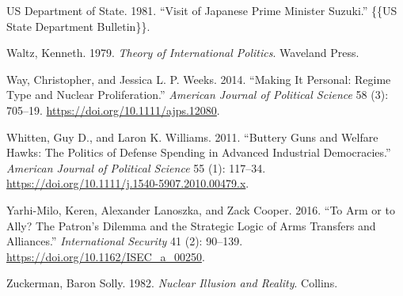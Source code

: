 \documentclass[
  12,
  letterpaper,
  DIV=11,
  numbers=noendperiod]{scrartcl}
\newlength{\cslhangindent}
\newlength{\cslentryspacingunit} %
\newenvironment{CSLReferences}[2] %
 {%
  \setlength{\parindent}{0pt}
  \ifodd #1
  \let\oldpar\par
  \def\par{\hangindent=\cslhangindent\oldpar}
  \fi
  \setlength{\parskip}{#2\cslentryspacingunit}
 }%
 {}
\begin{document}
\begin{CSLReferences}{1}{0}
\leavevmode{}%
US Department of State. 1981. {``Visit of {Japanese Prime Minister
Suzuki}.''} \{\{US State Department Bulletin\}\}.

\leavevmode{}%
Waltz, Kenneth. 1979. \emph{Theory of {International Politics}}.
{Waveland Press}.

\leavevmode{}%
Way, Christopher, and Jessica L. P. Weeks. 2014. {``Making {It
Personal}: {Regime Type} and {Nuclear Proliferation}.''} \emph{American
Journal of Political Science} 58 (3): 705--19.
\url{https://doi.org/10.1111/ajps.12080}.

\leavevmode{}%
Whitten, Guy D., and Laron K. Williams. 2011. {``Buttery {Guns} and
{Welfare Hawks}: {The Politics} of {Defense Spending} in {Advanced
Industrial Democracies}.''} \emph{American Journal of Political Science}
55 (1): 117--34. \url{https://doi.org/10.1111/j.1540-5907.2010.00479.x}.

\leavevmode{}%
Yarhi-Milo, Keren, Alexander Lanoszka, and Zack Cooper. 2016. {``To
{Arm} or to {Ally}? {The Patron}'s {Dilemma} and the {Strategic Logic}
of {Arms Transfers} and {Alliances}.''} \emph{International Security} 41
(2): 90--139. \url{https://doi.org/10.1162/ISEC_a_00250}.

\leavevmode{}%
Zuckerman, Baron Solly. 1982. \emph{Nuclear Illusion and Reality}.
{Collins}.

\end{CSLReferences}
\end{document}

